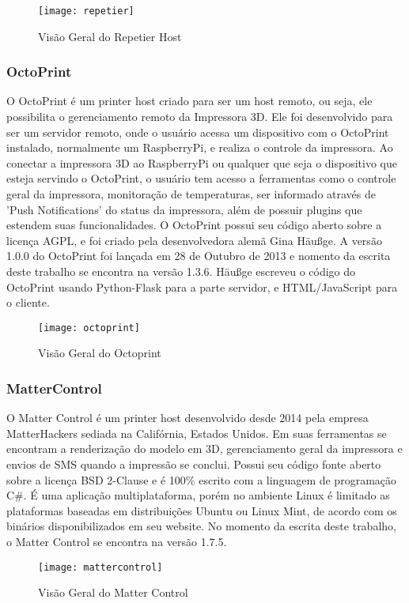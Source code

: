 \begin{figure}[H]
    \centering
    \caption[Repetier Host]{Visão Geral do Repetier Host}
    \texttt{[image: repetier]}
\end{figure}

\subsubsection{OctoPrint}
O OctoPrint é um printer host criado para ser um host remoto, ou seja, ele possibilita
o gerenciamento remoto da Impressora 3D. Ele foi desenvolvido para ser um servidor remoto,
onde o usuário acessa um dispositivo com o OctoPrint instalado, normalmente um RaspberryPi,
e realiza o controle da impressora. Ao conectar a impressora 3D ao RaspberryPi ou
qualquer que seja o dispositivo que esteja servindo o OctoPrint, o usuário tem
acesso a ferramentas como o controle geral da impressora, monitoração de temperaturas,
ser informado através de 'Push Notifications' do status da impressora, além de possuir
 plugins que estendem suas funcionalidades. O OctoPrint possui seu código aberto
 sobre a licença AGPL, e foi criado pela desenvolvedora alemã Gina Häußge. A versão
 1.0.0 do OctoPrint foi lançada em 28 de Outubro de 2013 e nomento da escrita deste trabalho se encontra na versão 1.3.6.
Häußge escreveu o código do OctoPrint usando Python-Flask para a parte servidor, e HTML/JavaScript para o cliente.
\iffalse
Referências:
- Release: https://github.com/foosel/OctoPrint/releases
- Author: https://foosel.net/
- Licença: https://github.com/foosel/OctoPrint/blob/master/LICENSE
- Site: octoprint.org
- Features: https://octoprint.org/#full-remote-control-and-monitoring
https://octoprint.org/#compatible-and-extendable
\fi
\begin{figure}[H]
    \centering
    \caption[Octoprint]{Visão Geral do Octoprint}
    \texttt{[image: octoprint]}
\end{figure}

\subsubsection{MatterControl}
O Matter Control é um printer host desenvolvido desde 2014 pela empresa MatterHackers sediada
na Califórnia, Estados Unidos. Em suas ferramentas se encontram a renderização do modelo em 3D,
gerenciamento geral da impressora e envios de SMS quando a impressão se conclui.
Possui seu código fonte aberto sobre a licença BSD 2-Clause e é 100\% escrito
com a linguagem de programação C\#. É uma aplicação multiplataforma, porém no ambiente
Linux é limitado as plataformas baseadas em distribuições Ubuntu ou Linux Mint, de acordo com os binários
disponibilizados em seu website. No momento da escrita deste trabalho, o Matter Control se encontra na versão 1.7.5.
\iffalse
Referências:
- Release: https://github.com/MatterHackers/MatterControl/tree/Releases
- Author: Matter Hackers
- Licença: https://github.com/MatterHackers/MatterControl/blob/master/LICENSE
- Site: https://www.matterhackers.com/mattercontrol
\fi

\begin{figure}[H]
    \centering
    \caption[Repetier Host]{Visão Geral do Matter Control}
    \texttt{[image: mattercontrol]}
\end{figure}
